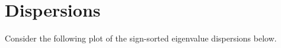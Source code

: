 \newpage

\newpage

\newpage

\newpage

\newpage

\newpage


\newpage
\section{Dispersions}

Consider the following plot of the sign-sorted eigenvalue dispersions below.
